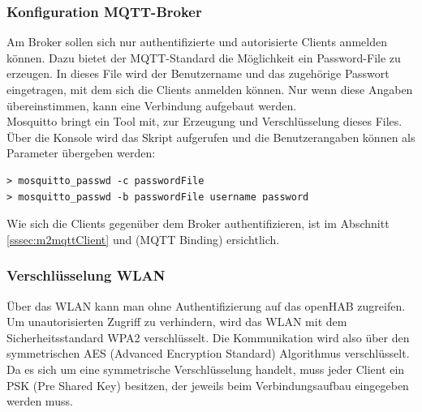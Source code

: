 \subsubsection{Konfiguration MQTT-Broker}
Am Broker sollen sich nur authentifizierte und autorisierte Clients anmelden können. Dazu bietet der MQTT-Standard die Möglichkeit ein Password-File zu erzeugen. In dieses File wird der Benutzername und das zugehörige Passwort eingetragen, mit dem sich die Clients anmelden können. Nur wenn diese Angaben übereinstimmen, kann eine Verbindung aufgebaut werden. \\
Mosquitto bringt ein Tool mit, zur Erzeugung und Verschlüsselung dieses Files. Über die Konsole wird das Skript aufgerufen und die Benutzerangaben können als Parameter übergeben werden:
\begin{lstlisting}[style=csharp, caption=mosquitto\_passwd.exe - generate password-file]
> mosquitto_passwd -c passwordFile
> mosquitto_passwd -b passwordFile username password
\end{lstlisting}
Wie sich die Clients gegenüber dem Broker authentifizieren, ist im Abschnitt \ref{sssec:m2mqttClient} und \tbd (MQTT Binding) ersichtlich.

\subsubsection{Verschlüsselung WLAN}
Über das WLAN kann man ohne Authentifizierung auf das openHAB zugreifen. Um unautorisierten Zugriff zu verhindern, wird das WLAN mit dem Sicherheitsstandard WPA2 verschlüsselt. Die Kommunikation wird also über den symmetrischen AES (Advanced Encryption Standard) Algorithmus verschlüsselt. Da es sich um eine symmetrische Verschlüsselung handelt, muss jeder Client ein PSK (Pre Shared Key) besitzen, der jeweils beim Verbindungsaufbau eingegeben werden muss.





